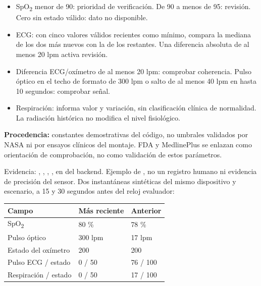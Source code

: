 \begin{itemize}
\item SpO\textsubscript{2} menor de 90: prioridad de verificación. De 90 a menos de 95: revisión. Cero sin estado válido: dato no disponible.
\item ECG: con cinco valores válidos recientes como mínimo, compara la mediana de los dos más nuevos con la de los restantes. Una diferencia absoluta de al menos 20 lpm activa revisión.
\item Diferencia ECG/oxímetro de al menos 20 lpm: comprobar coherencia. Pulso óptico en el techo de formato de 300 lpm o salto de al menos 40 lpm en hasta 10 segundos: comprobar señal.
\item Respiración: informa valor y variación, sin clasificación clínica de normalidad. La radiación histórica no modifica el nivel fisiológico.
\end{itemize}
\begin{infobox}\textbf{Procedencia:} constantes demostrativas del código, no umbrales validados por NASA ni por ensayos clínicos del montaje. FDA y MedlinePlus se enlazan como orientación de comprobación, no como validación de estos parámetros.\end{infobox}
{\footnotesize\color{muted}Evidencia: , , , , en  del backend.}
\newpage
{}
Ejemplo de , no un registro humano ni evidencia de precisión del sensor. Dos instantáneas sintéticas del mismo dispositivo y escenario, a 15 y 30 segundos antes del reloj evaluador:
\par\noindent\begin{tabularx}{\linewidth}{@{}lXX@{}}
\toprule Campo & Más reciente & Anterior\\\midrule
SpO\textsubscript{2} & 80 \% & 78 \%\\
Pulso óptico & 300 lpm & 17 lpm\\
Estado del oxímetro & 200 & 200\\
Pulso ECG / estado & 0 / 50 & 76 / 100\\
Respiración / estado & 0 / 50 & 17 / 100\\\bottomrule
\end{tabularx}\par
